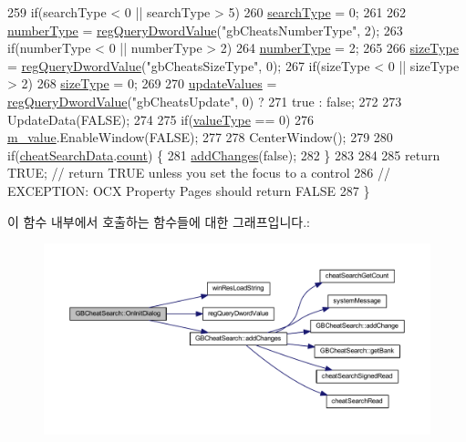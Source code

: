 \begin{DoxyCode}
259   \textcolor{keywordflow}{if}(searchType < 0 || searchType > 5)
260     \mbox{\hyperlink{class_g_b_cheat_search_a35d0a28509b050fcb3608d6f9777bda7}{searchType}} = 0;
261   
262   \mbox{\hyperlink{class_g_b_cheat_search_aff51de1046c650805a8b749aa8df9cad}{numberType}} = \mbox{\hyperlink{_reg_8cpp_a150640889ffff4851ee26d7b999ec7c3}{regQueryDwordValue}}(\textcolor{stringliteral}{"gbCheatsNumberType"}, 2);
263   \textcolor{keywordflow}{if}(numberType < 0 || numberType > 2)
264     \mbox{\hyperlink{class_g_b_cheat_search_aff51de1046c650805a8b749aa8df9cad}{numberType}} = 2;
265   
266   \mbox{\hyperlink{class_g_b_cheat_search_ad6db93445aa94c36d4d5275204e7ecb0}{sizeType}} = \mbox{\hyperlink{_reg_8cpp_a150640889ffff4851ee26d7b999ec7c3}{regQueryDwordValue}}(\textcolor{stringliteral}{"gbCheatsSizeType"}, 0);
267   \textcolor{keywordflow}{if}(sizeType < 0 || sizeType > 2)
268     \mbox{\hyperlink{class_g_b_cheat_search_ad6db93445aa94c36d4d5275204e7ecb0}{sizeType}} = 0;
269   
270   \mbox{\hyperlink{class_g_b_cheat_search_aa300097df0223fda71edea99324e9cb6}{updateValues}} = \mbox{\hyperlink{_reg_8cpp_a150640889ffff4851ee26d7b999ec7c3}{regQueryDwordValue}}(\textcolor{stringliteral}{"gbCheatsUpdate"}, 0) ?
271     true : \textcolor{keyword}{false};
272   
273   UpdateData(FALSE);
274 
275   \textcolor{keywordflow}{if}(\mbox{\hyperlink{class_g_b_cheat_search_a86a4834163ee6a13a5bb8531a7c67c1d}{valueType}} == 0)
276     \mbox{\hyperlink{class_g_b_cheat_search_a95286f2e1e0637f2879a2dbe729d34c1}{m\_value}}.EnableWindow(FALSE);
277   
278   CenterWindow();
279 
280   \textcolor{keywordflow}{if}(\mbox{\hyperlink{_cheat_search_8cpp_aeeb4f5916a0f16b1bb45e57aa2cc58d4}{cheatSearchData}}.\mbox{\hyperlink{struct_cheat_search_data_a4c4d3092ddaff068d820c28067b15774}{count}}) \{
281     \mbox{\hyperlink{class_g_b_cheat_search_a10b0314fc3b27cda2e217539c9c1e052}{addChanges}}(\textcolor{keyword}{false});
282   \}
283 
284   
285   \textcolor{keywordflow}{return} TRUE;  \textcolor{comment}{// return TRUE unless you set the focus to a control}
286                 \textcolor{comment}{// EXCEPTION: OCX Property Pages should return FALSE}
287 \}
\end{DoxyCode}
이 함수 내부에서 호출하는 함수들에 대한 그래프입니다.\+:
\nopagebreak
\begin{figure}[H]
\begin{center}
\leavevmode
\includegraphics[width=350pt]{class_g_b_cheat_search_a8aba3602d876fba97b2ef5195dc0b648_cgraph}
\end{center}
\end{figure}
